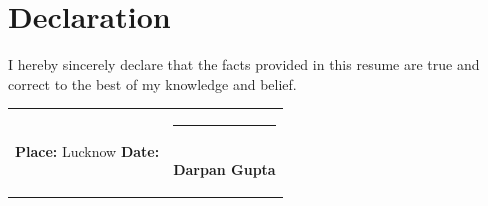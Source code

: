 \documentclass[10pt,a4paper]{article}
\begin{document}
\section{Declaration}
\vspace{-6pt}
I hereby sincerely declare that the facts provided in this resume are true and correct
to the best of my knowledge and belief.

\vspace{-2pt}
\begin{tabularx}{\textwidth}{@{}X r@{}}
\textbf{Place:} Lucknow \quad \textbf{Date:} \underline{\hspace{2.5cm}} &
\raisebox{-0.9\height}{\parbox{4.5cm}{\centering\rule{3.2cm}{0.4pt}\\[2pt]\textbf{Darpan Gupta}}}\\
\end{tabularx}
\end{document}
